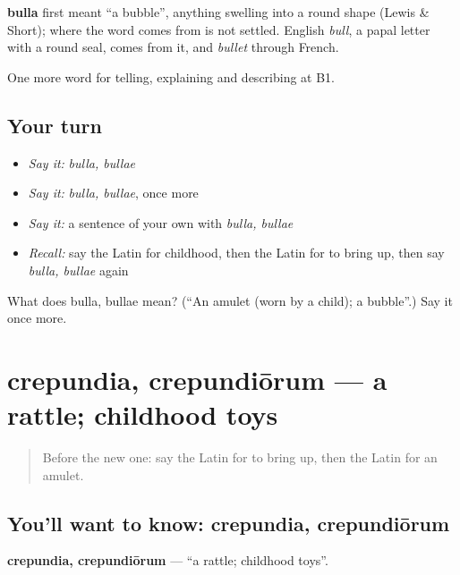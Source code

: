 \begin{cousinweb}
\textbf{bulla} first meant \textquotedblleft{}a bubble\textquotedblright{}, anything swelling into a round shape (Lewis \& Short); where the word comes from is not settled. English \emph{bull}, a papal letter with a round seal, comes from it, and \emph{bullet} through French.
\end{cousinweb}

\begin{grammarlens}[title={What you've built}]
One more word for telling, explaining and describing at B1.
\end{grammarlens}

\subsection*{Your turn}
\begin{itemize}
\raggedright
  \item \emph{Say it:} \emph{bulla, bullae}
  \item \emph{Say it:} \emph{bulla, bullae}, once more
  \item \emph{Say it:} a sentence of your own with \emph{bulla, bullae}
  \item \emph{Recall:} say the Latin for childhood, then the Latin for to bring up, then say \emph{bulla, bullae} again
\end{itemize}

\begin{tcolorbox}[breakable,colback=teal!4,colframe=teal!35!black,title={Before you move on}]
What does bulla, bullae mean? (\textquotedblleft{}An amulet (worn by a child); a bubble\textquotedblright{}.) Say it once more.
\end{tcolorbox}
\section[crepundia, crepundiōrum]{crepundia, crepundiōrum — a rattle; childhood toys}

\label{lesson:LA-C325-crepundia}



\begin{quote}
Before the new one: say the Latin for to bring up, then the Latin for an amulet.
\end{quote}

\subsection*{You'll want to know: crepundia, crepundiōrum}
\textbf{crepundia, crepundiōrum} — \textquotedblleft{}a rattle; childhood toys\textquotedblright{}.

